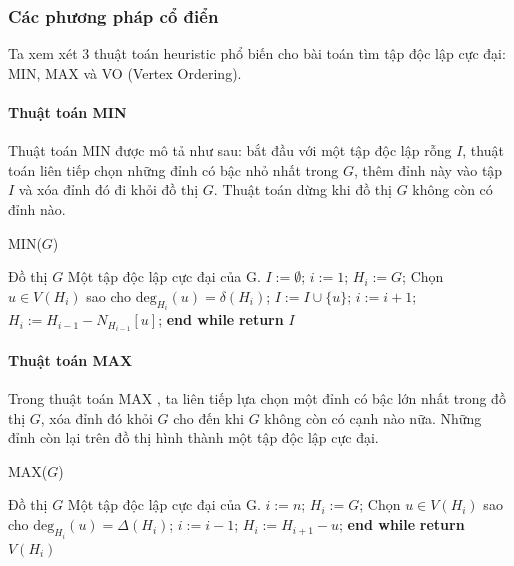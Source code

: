 \documentclass[14pt, oneside, a4paper, openany]{scrartcl}
\begin{document}
\subsubsection{Các phương pháp cổ điển}
Ta xem xét 3 thuật toán heuristic phổ biến cho bài toán tìm tập độc lập cực đại: MIN, MAX và VO (Vertex Ordering).

\paragraph{Thuật toán MIN}
\cite{MINAlgorithm} Thuật toán MIN  được mô tả như sau: bắt đầu với một tập độc lập rỗng $I$, thuật toán liên tiếp chọn những đỉnh có bậc nhỏ nhất trong $G$, thêm đỉnh này vào tập $I$ và xóa đỉnh đó đi khỏi đồ thị $G$. Thuật toán dừng khi đồ thị $G$ không còn có đỉnh nào.

\begin{algorithm}
	\caption{MIN($G$)}\label{MIN}
	\begin{algorithmic}[1]
		\INPUT Đồ thị $G$
		\OUTPUT Một tập độc lập cực đại của G.
		\State $I:= \emptyset$; $i:=1$; $H_i := G$;
			\State Chọn $u \in V(H_i)$ sao cho $\textrm{deg}_{H_i}(u) = \delta(H_i)$;
			\State $I := I \cup \{u\}$; $i:=i+1$; $H_i := H_{i-1} - N_{H_{i-1}}[u]$;
		\EndWhile
		\State \textbf{end while}
		\State \textbf{return} $I$
	\end{algorithmic}
\end{algorithm}
\paragraph{Thuật toán MAX}
Trong thuật toán MAX  \cite{MAXAlgorithm}, ta liên tiếp lựa chọn một đỉnh có bậc lớn nhất trong đồ thị $G$, xóa đỉnh đó khỏi $G$ cho đến khi $G$ không còn có cạnh nào nữa. Những đỉnh còn lại trên đồ thị hình thành một tập độc lập cực đại.

\begin{algorithm}
	\caption{MAX($G$)}\label{MAX}
	\begin{algorithmic}[1]
		\INPUT Đồ thị $G$
		\OUTPUT Một tập độc lập cực đại của G.
		\State $i:=n$; $H_i := G$;
			\State Chọn $u \in V(H_i)$ sao cho $\textrm{deg}_{H_i}(u) = \Delta(H_i)$;
			\State $i:=i - 1$; $H_i := H_{i+1} - u$;
		\EndWhile
		\State \textbf{end while}
		\State \textbf{return} $V(H_i)$
	\end{algorithmic}
\end{algorithm}
\end{document}
